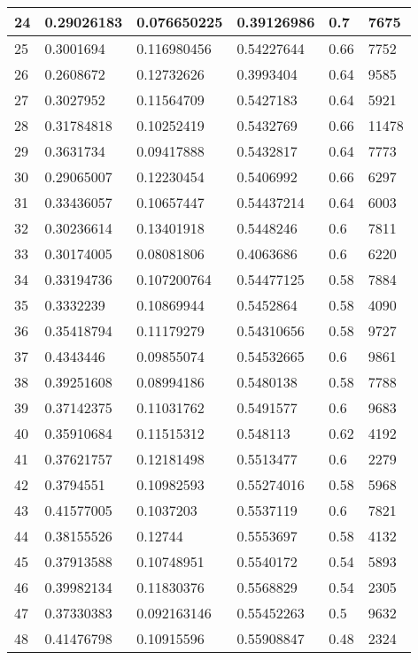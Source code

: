 \begin{longtable}{|l|l|l|l|l|l|}
24 & 0.29026183 & 0.076650225 & 0.39126986 & 0.7 & 7675 \\ \hline 
25 & 0.3001694 & 0.116980456 & 0.54227644 & 0.66 & 7752 \\ \hline 
26 & 0.2608672 & 0.12732626 & 0.3993404 & 0.64 & 9585 \\ \hline 
27 & 0.3027952 & 0.11564709 & 0.5427183 & 0.64 & 5921 \\ \hline 
28 & 0.31784818 & 0.10252419 & 0.5432769 & 0.66 & 11478 \\ \hline 
29 & 0.3631734 & 0.09417888 & 0.5432817 & 0.64 & 7773 \\ \hline 
30 & 0.29065007 & 0.12230454 & 0.5406992 & 0.66 & 6297 \\ \hline 
31 & 0.33436057 & 0.10657447 & 0.54437214 & 0.64 & 6003 \\ \hline 
32 & 0.30236614 & 0.13401918 & 0.5448246 & 0.6 & 7811 \\ \hline 
33 & 0.30174005 & 0.08081806 & 0.4063686 & 0.6 & 6220 \\ \hline 
34 & 0.33194736 & 0.107200764 & 0.54477125 & 0.58 & 7884 \\ \hline 
35 & 0.3332239 & 0.10869944 & 0.5452864 & 0.58 & 4090 \\ \hline 
36 & 0.35418794 & 0.11179279 & 0.54310656 & 0.58 & 9727 \\ \hline 
37 & 0.4343446 & 0.09855074 & 0.54532665 & 0.6 & 9861 \\ \hline 
38 & 0.39251608 & 0.08994186 & 0.5480138 & 0.58 & 7788 \\ \hline 
39 & 0.37142375 & 0.11031762 & 0.5491577 & 0.6 & 9683 \\ \hline 
40 & 0.35910684 & 0.11515312 & 0.548113 & 0.62 & 4192 \\ \hline 
41 & 0.37621757 & 0.12181498 & 0.5513477 & 0.6 & 2279 \\ \hline 
42 & 0.3794551 & 0.10982593 & 0.55274016 & 0.58 & 5968 \\ \hline 
43 & 0.41577005 & 0.1037203 & 0.5537119 & 0.6 & 7821 \\ \hline 
44 & 0.38155526 & 0.12744 & 0.5553697 & 0.58 & 4132 \\ \hline 
45 & 0.37913588 & 0.10748951 & 0.5540172 & 0.54 & 5893 \\ \hline 
46 & 0.39982134 & 0.11830376 & 0.5568829 & 0.54 & 2305 \\ \hline 
47 & 0.37330383 & 0.092163146 & 0.55452263 & 0.5 & 9632 \\ \hline 
48 & 0.41476798 & 0.10915596 & 0.55908847 & 0.48 & 2324 \\ \hline 

\end{longtable}
